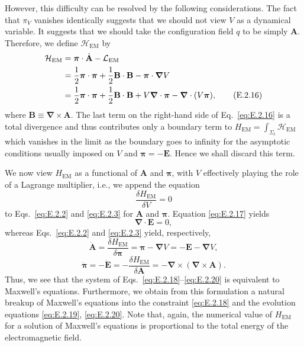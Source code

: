 However, this difficulty can be resolved by the following considerations. The fact
that \(\pi_V\) vanishes identically suggests that we should not view \(V\) as a
dynamical variable. It suggests that we should take the configuration field \(q\) to
be simply \(\mathbf{A}\). Therefore, we define \(\mathcal H_{\mathrm{EM}}\) by
\begin{align}
  \mathcal H_{\mathrm{EM}}
    &=\boldsymbol{\pi}\cdot\dot{\mathbf{A}}-\mathcal L_{\mathrm{EM}}\notag\\
    &=\frac{1}{2}\boldsymbol{\pi}\cdot\boldsymbol{\pi}
      +\frac{1}{2}\mathbf{B}\cdot\mathbf{B}-\boldsymbol{\pi}\cdot\boldsymbol{\nabla} V\notag\\
    &=\frac{1}{2}\boldsymbol{\pi}\cdot\boldsymbol{\pi}
      +\frac{1}{2}\mathbf{B}\cdot\mathbf{B}
      +V\boldsymbol{\nabla}\cdot\boldsymbol{\pi}-\boldsymbol{\nabla}\cdot(V\boldsymbol{\pi}),
  \tag{E.2.16}\label{eq:E.2.16}
\end{align}
where \(\mathbf{B}\equiv\boldsymbol{\nabla}\times\mathbf{A}\). The last term on the right-hand side
of Eq.~\eqref{eq:E.2.16} is a total divergence and thus contributes only a boundary
term to \(H_{\mathrm{EM}}=\int_{\Sigma_t}\mathcal H_{\mathrm{EM}}\) which vanishes
in the limit as the boundary goes to infinity for the asymptotic conditions usually
imposed on \(V\) and \(\boldsymbol{\pi}=-\mathbf{E}\). Hence we shall discard this term.

We now view \(H_{\mathrm{EM}}\) as a functional of \(\mathbf{A}\) and \(\boldsymbol{\pi}\), with
\(V\) effectively playing the role of a Lagrange multiplier, i.e., we append the
equation
\begin{equation}
  \frac{\delta H_{\mathrm{EM}}}{\delta V}=0
  \tag{E.2.17}\label{eq:E.2.17}
\end{equation}
to Eqs.~\eqref{eq:E.2.2} and \eqref{eq:E.2.3} for \(\mathbf{A}\) and \(\boldsymbol{\pi}\).
Equation \eqref{eq:E.2.17} yields
\begin{equation}
  \boldsymbol{\nabla}\cdot\mathbf{E}=0,
  \tag{E.2.18}\label{eq:E.2.18}
\end{equation}
whereas Eqs.~\eqref{eq:E.2.2} and \eqref{eq:E.2.3} yield, respectively,
\begin{equation}
  \dot{\mathbf{A}}=\frac{\delta H_{\mathrm{EM}}}{\delta\boldsymbol{\pi}}
    =\boldsymbol{\pi}-\boldsymbol{\nabla} V=-\mathbf{E}-\boldsymbol{\nabla} V,
  \tag{E.2.19}\label{eq:E.2.19}
\end{equation}
\begin{equation}
  \dot{\boldsymbol{\pi}}=-\dot{\mathbf{E}}
    =-\frac{\delta H_{\mathrm{EM}}}{\delta\mathbf{A}}
    =-\boldsymbol{\nabla}\times(\boldsymbol{\nabla}\times\mathbf{A}).
  \tag{E.2.20}\label{eq:E.2.20}
\end{equation}
Thus, we see that the system of Eqs.~\eqref{eq:E.2.18}--\eqref{eq:E.2.20} is
equivalent to Maxwell's equations. Furthermore, we obtain from this formulation a
natural breakup of Maxwell's equations into the constraint \eqref{eq:E.2.18} and
the evolution equations \eqref{eq:E.2.19}, \eqref{eq:E.2.20}. Note that, again,
the numerical value of \(H_{\mathrm{EM}}\) for a solution of Maxwell's equations is
proportional to the total energy of the electromagnetic field.


